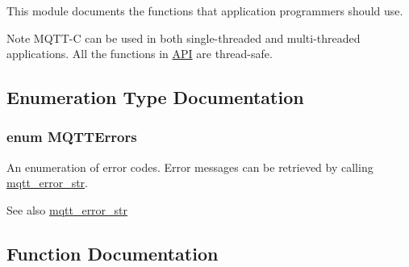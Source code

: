 This module documents the functions that application programmers should use.

\begin{DoxyNote}{Note}
M\+Q\+T\+T-\/C can be used in both single-\/threaded and multi-\/threaded applications. All the functions in \hyperlink{group__api}{A\+PI} are thread-\/safe. 
\end{DoxyNote}


\subsection{Enumeration Type Documentation}
\subsubsection[{\texorpdfstring{M\+Q\+T\+T\+Errors}{MQTTErrors}}]{\setlength{\rightskip}{0pt plus 5cm}enum {\bf M\+Q\+T\+T\+Errors}}\hypertarget{group__api_gad0c901a8d30691ed0ca17915b691b7e7}{}\label{group__api_gad0c901a8d30691ed0ca17915b691b7e7}


An enumeration of error codes. Error messages can be retrieved by calling \hyperlink{group__api_ga47b62bdd24e8b05957825d2419d7c848}{mqtt\+\_\+error\+\_\+str}. 

\begin{DoxySeeAlso}{See also}
\hyperlink{group__api_ga47b62bdd24e8b05957825d2419d7c848}{mqtt\+\_\+error\+\_\+str} 
\end{DoxySeeAlso}


\subsection{Function Documentation}
